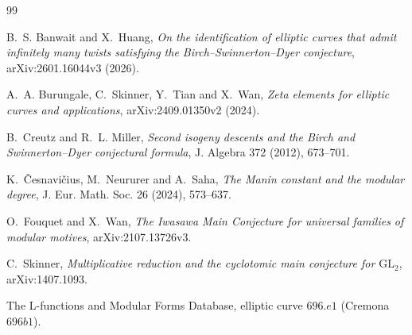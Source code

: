 \documentclass[11pt]{article}
\begin{document}
\begin{thebibliography}{99}

B.~S. Banwait and X.~Huang,
\emph{On the identification of elliptic curves that admit infinitely many
twists satisfying the Birch--Swinnerton--Dyer conjecture},
arXiv:2601.16044v3 (2026).

A.~A. Burungale, C.~Skinner, Y.~Tian and X.~Wan,
\emph{Zeta elements for elliptic curves and applications},
arXiv:2409.01350v2 (2024).

B.~Creutz and R.~L. Miller,
\emph{Second isogeny descents and the Birch and Swinnerton--Dyer
conjectural formula},
J. Algebra 372 (2012), 673--701.

K.~Česnavičius, M.~Neururer and A.~Saha,
\emph{The Manin constant and the modular degree},
J. Eur. Math. Soc. 26 (2024), 573--637.

O.~Fouquet and X.~Wan,
\emph{The Iwasawa Main Conjecture for universal families of modular motives},
arXiv:2107.13726v3.

C.~Skinner,
\emph{Multiplicative reduction and the cyclotomic main conjecture for
\(\mathrm{GL}_2\)},
arXiv:1407.1093.

The L-functions and Modular Forms Database,
elliptic curve \(696.e1\) (Cremona \(696b1\)).

\end{thebibliography}
\end{document}
